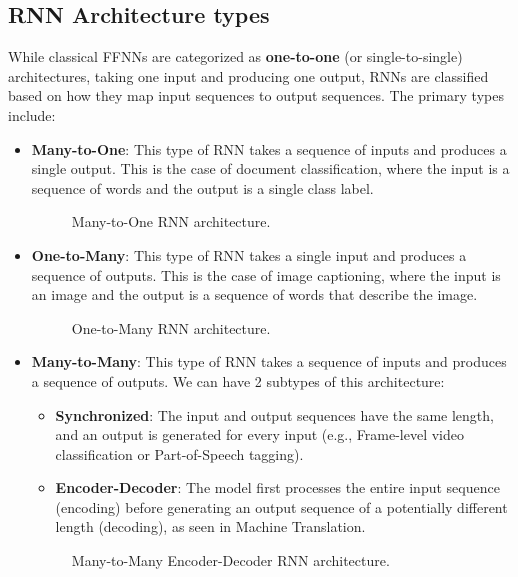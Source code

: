 \subsection{RNN Architecture types}
While classical FFNNs are categorized as \textbf{one-to-one} (or single-to-single)
architectures, taking one input and producing one output, RNNs are classified based on how they map input sequences to output sequences.
The primary types include:
\begin{itemize}
    \item \textbf{Many-to-One}: This type of RNN takes a sequence of inputs and produces a single output.
    This is the case of document classification, where the input is a sequence of words and the output is a single class label.
    \begin{figure}[H]
        \centering
        
        \caption{Many-to-One RNN architecture.}
    \end{figure}

    \item \textbf{One-to-Many}: This type of RNN takes a single input and produces a sequence of outputs.
    This is the case of image captioning, where the input is an image and the output is a sequence of words that describe the image.
    \begin{figure}[H]
        \centering
        
        \caption{One-to-Many RNN architecture.}
    \end{figure}
    \item \textbf{Many-to-Many}: This type of RNN takes a sequence of inputs and produces a sequence of outputs.
    We can have 2 subtypes of this architecture:
    \begin{itemize}
        \item \textbf{Synchronized}: The input and output sequences have the same length, and an output is generated for every input
        (e.g., Frame-level video classification or Part-of-Speech tagging).
        \item \textbf{Encoder-Decoder}: The model first processes the entire input sequence (encoding) before generating an output sequence of a potentially different length (decoding),
        as seen in Machine Translation.
    \end{itemize}
    \begin{figure}[H]
        \centering
        \begin{minipage}{0.45\textwidth}
            \centering
            
            \caption{Many-to-Many Synchronized RNN architecture.}
        \end{minipage}
        \hfill
        \begin{minipage}{0.45\textwidth}
            \centering
            
            \caption{Many-to-Many Encoder-Decoder RNN architecture.}
        \end{minipage}
    \end{figure}
\end{itemize}

